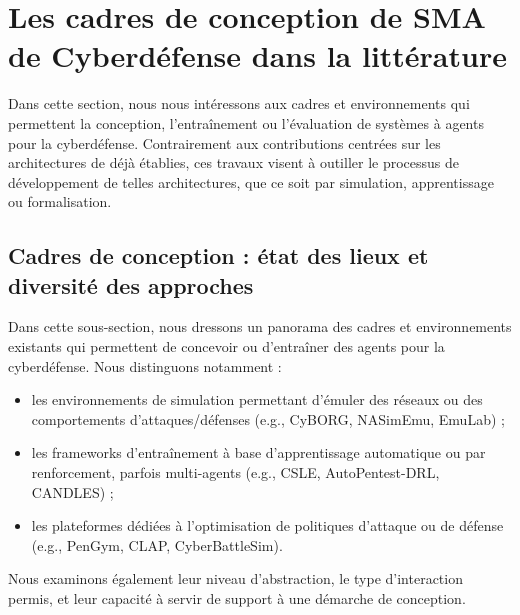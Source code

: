 \section{Les cadres de conception de SMA de Cyberdéfense dans la littérature}\label{sec:sma-cyberdefense-conception}

Dans cette section, nous nous intéressons aux cadres et environnements qui permettent la conception, l'entraînement ou l'évaluation de systèmes à agents pour la cyberdéfense. Contrairement aux contributions centrées sur les architectures de  déjà établies, ces travaux visent à outiller le processus de développement de telles architectures, que ce soit par simulation, apprentissage ou formalisation.

\subsection{Cadres de conception : état des lieux et diversité des approches}

Dans cette sous-section, nous dressons un panorama des cadres et environnements existants qui permettent de concevoir ou d'entraîner des agents pour la cyberdéfense. Nous distinguons notamment :
\begin{itemize}
    \item les environnements de simulation permettant d’émuler des réseaux ou des comportements d’attaques/défenses (e.g., CyBORG, NASimEmu, EmuLab) ;
    \item les frameworks d’entraînement à base d’apprentissage automatique ou par renforcement, parfois multi-agents (e.g., CSLE, AutoPentest-DRL, CANDLES) ;
    \item les plateformes dédiées à l’optimisation de politiques d’attaque ou de défense (e.g., PenGym, CLAP, CyberBattleSim).
\end{itemize}

Nous examinons également leur niveau d’abstraction, le type d’interaction permis, et leur capacité à servir de support à une démarche de conception.

\medskip

